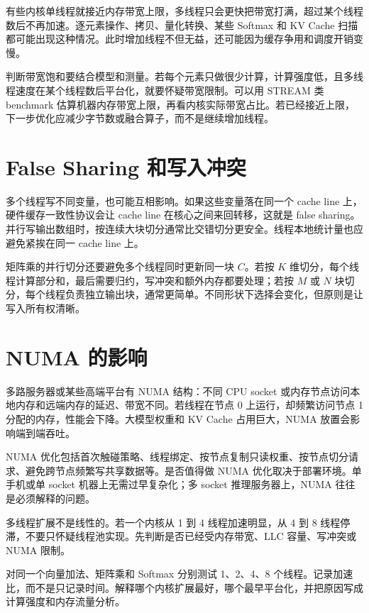 有些内核单线程就接近内存带宽上限，多线程只会更快把带宽打满，超过某个线程数后不再加速。逐元素操作、拷贝、量化转换、某些 Softmax 和 KV Cache 扫描都可能出现这种情况。此时增加线程不但无益，还可能因为缓存争用和调度开销变慢。

判断带宽饱和要结合模型和测量。若每个元素只做很少计算，计算强度低，且多线程速度在某个线程数后平台化，就要怀疑带宽限制。可以用 STREAM 类 benchmark 估算机器内存带宽上限，再看内核实际带宽占比。若已经接近上限，下一步优化应减少字节数或融合算子，而不是继续增加线程。

\section{False Sharing 和写入冲突}

多个线程写不同变量，也可能互相影响。如果这些变量落在同一个 cache line 上，硬件缓存一致性协议会让 cache line 在核心之间来回转移，这就是 false sharing。并行写输出数组时，按连续大块切分通常比交错切分更安全。线程本地统计量也应避免紧挨在同一 cache line 上。

矩阵乘的并行切分还要避免多个线程同时更新同一块 $C$。若按 $K$ 维切分，每个线程计算部分和，最后需要归约，写冲突和额外内存都要处理；若按 $M$ 或 $N$ 块切分，每个线程负责独立输出块，通常更简单。不同形状下选择会变化，但原则是让写入所有权清晰。

\section{NUMA 的影响}

多路服务器或某些高端平台有 NUMA 结构：不同 CPU socket 或内存节点访问本地内存和远端内存的延迟、带宽不同。若线程在节点 0 上运行，却频繁访问节点 1 分配的内存，性能会下降。大模型权重和 KV Cache 占用巨大，NUMA 放置会影响端到端吞吐。

NUMA 优化包括首次触碰策略、线程绑定、按节点复制只读权重、按节点切分请求、避免跨节点频繁写共享数据等。是否值得做 NUMA 优化取决于部署环境。单手机或单 socket 机器上无需过早复杂化；多 socket 推理服务器上，NUMA 往往是必须解释的问题。

\begin{warningbox}
多线程扩展不是线性的。若一个内核从 1 到 4 线程加速明显，从 4 到 8 线程停滞，不要只怀疑线程池实现。先判断是否已经受内存带宽、LLC 容量、写冲突或 NUMA 限制。
\end{warningbox}

\begin{exercisebox}
对同一个向量加法、矩阵乘和 Softmax 分别测试 1、2、4、8 个线程。记录加速比，而不是只记录时间。解释哪个内核扩展最好，哪个最早平台化，并把原因写成计算强度和内存流量分析。
\end{exercisebox}
